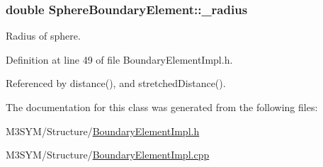 \hypertarget{classSphereBoundaryElement_a292f2562c66472f77e516ea19121f360}{
\subsubsection[{\+\_\+radius}]{\setlength{\rightskip}{0pt plus 5cm}double Sphere\+Boundary\+Element\+::\+\_\+radius\hspace{0.3cm}{\ttfamily [private]}}}\label{classSphereBoundaryElement_a292f2562c66472f77e516ea19121f360}


Radius of sphere. 



Definition at line 49 of file Boundary\+Element\+Impl.\+h.



Referenced by distance(), and stretched\+Distance().



The documentation for this class was generated from the following files\+:\begin{DoxyCompactItemize}
\item 
M3\+S\+Y\+M/\+Structure/\hyperlink{BoundaryElementImpl_8h}{Boundary\+Element\+Impl.\+h}\item 
M3\+S\+Y\+M/\+Structure/\hyperlink{BoundaryElementImpl_8cpp}{Boundary\+Element\+Impl.\+cpp}\end{DoxyCompactItemize}

